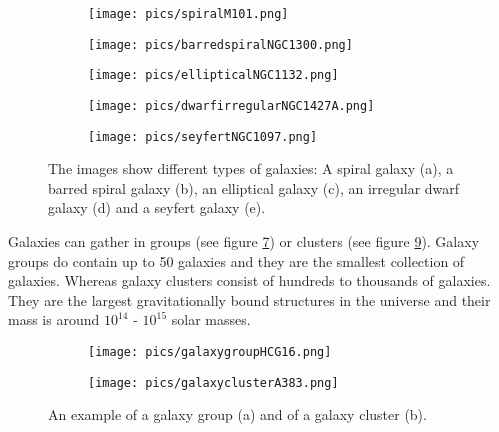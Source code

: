 \begin{figure}[H]
	\centering
		\begin{subfigure}[b]{0.49\textwidth}
			\texttt{[image: pics/spiralM101.png]}
			\caption{}
			\label{fig:spiralM101}
		\end{subfigure}
		\begin{subfigure}[b]{0.49\textwidth}
			\texttt{[image: pics/barredspiralNGC1300.png]}
			\caption{}
			\label{fig:barredspiralNGC1300}
		\end{subfigure}
		\begin{subfigure}[b]{0.49\textwidth}
			\texttt{[image: pics/ellipticalNGC1132.png]}
			\caption{}
			\label{fig:ellipitcalNGC1332}
		\end{subfigure}
		\begin{subfigure}[b]{0.49\textwidth}
			\texttt{[image: pics/dwarfirregularNGC1427A.png]}
			\caption{}
			\label{fig:dwarfirregularNGC1427A}
		\end{subfigure}
		\begin{subfigure}[b]{0.55\textwidth}
			\texttt{[image: pics/seyfertNGC1097.png]}
			\caption{}
			\label{fig:seyfertNGC1097}
		\end{subfigure}
\caption{The images show different types of galaxies: A spiral galaxy (a), a barred spiral galaxy (b), an elliptical galaxy (c), an irregular dwarf galaxy (d) and a seyfert galaxy (e).}
\end{figure}
Galaxies can gather in groups (see figure \ref{fig:galaxygroupHCG16}) or clusters (see figure \ref{fig:galaxyclusterA383}). Galaxy groups do contain up to 50 galaxies and they are the smallest collection of galaxies. Whereas galaxy clusters consist of hundreds to thousands of galaxies. They are the largest gravitationally bound structures in the universe and their mass is around $10^{14}$ - $10^{15}$ solar masses.
\begin{figure}[H]
	\centering
		\begin{subfigure}[b]{0.49\textwidth}
			\texttt{[image: pics/galaxygroupHCG16.png]}
			\caption{}
			\label{fig:galaxygroupHCG16}
		\end{subfigure}
		\begin{subfigure}[b]{0.49\textwidth}
			\texttt{[image: pics/galaxyclusterA383.png]}
			\caption{}
			\label{fig:galaxyclusterA383}
		\end{subfigure}
\caption{An example of a galaxy group (a) and of a galaxy cluster (b).}
\end{figure}


